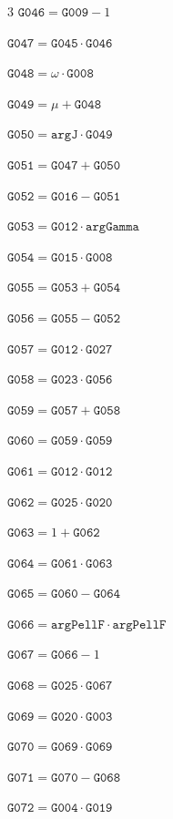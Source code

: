\documentclass[10pt]{article}
\begin{document}
\begin{multicols}{3}
\noindent $\mathtt{G046}=\mathtt{G009}-1$\par
\noindent $\mathtt{G047}=\mathtt{G045}\cdot \mathtt{G046}$\par
\noindent $\mathtt{G048}=\omega\cdot \mathtt{G008}$\par
\noindent $\mathtt{G049}=\mu+\mathtt{G048}$\par
\noindent $\mathtt{G050}=\mathtt{argJ}\cdot \mathtt{G049}$\par
\noindent $\mathtt{G051}=\mathtt{G047}+\mathtt{G050}$\par
\noindent $\mathtt{G052}=\mathtt{G016}-\mathtt{G051}$\par
\noindent $\mathtt{G053}=\mathtt{G012}\cdot \mathtt{argGamma}$\par
\noindent $\mathtt{G054}=\mathtt{G015}\cdot \mathtt{G008}$\par
\noindent $\mathtt{G055}=\mathtt{G053}+\mathtt{G054}$\par
\noindent $\mathtt{G056}=\mathtt{G055}-\mathtt{G052}$\par
\noindent $\mathtt{G057}=\mathtt{G012}\cdot \mathtt{G027}$\par
\noindent $\mathtt{G058}=\mathtt{G023}\cdot \mathtt{G056}$\par
\noindent $\mathtt{G059}=\mathtt{G057}+\mathtt{G058}$\par
\noindent $\mathtt{G060}=\mathtt{G059}\cdot \mathtt{G059}$\par
\noindent $\mathtt{G061}=\mathtt{G012}\cdot \mathtt{G012}$\par
\noindent $\mathtt{G062}=\mathtt{G025}\cdot \mathtt{G020}$\par
\noindent $\mathtt{G063}=1+\mathtt{G062}$\par
\noindent $\mathtt{G064}=\mathtt{G061}\cdot \mathtt{G063}$\par
\noindent $\mathtt{G065}=\mathtt{G060}-\mathtt{G064}$\par
\noindent $\mathtt{G066}=\mathtt{argPellF}\cdot \mathtt{argPellF}$\par
\noindent $\mathtt{G067}=\mathtt{G066}-1$\par
\noindent $\mathtt{G068}=\mathtt{G025}\cdot \mathtt{G067}$\par
\noindent $\mathtt{G069}=\mathtt{G020}\cdot \mathtt{G003}$\par
\noindent $\mathtt{G070}=\mathtt{G069}\cdot \mathtt{G069}$\par
\noindent $\mathtt{G071}=\mathtt{G070}-\mathtt{G068}$\par
\noindent $\mathtt{G072}=\mathtt{G004}\cdot \mathtt{G019}$\par

\end{multicols}
\end{document}
